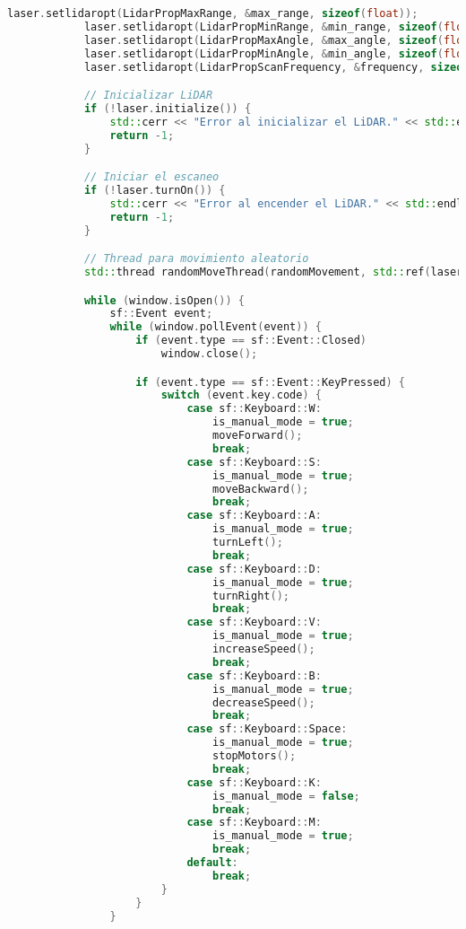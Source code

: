 \begin{lstlisting}[language={C++}, caption={Primera versi\'on del c\'odigo del sistema de control del robot}, label={Script}]
            laser.setlidaropt(LidarPropMaxRange, &max_range, sizeof(float));
            laser.setlidaropt(LidarPropMinRange, &min_range, sizeof(float));
            laser.setlidaropt(LidarPropMaxAngle, &max_angle, sizeof(float));
            laser.setlidaropt(LidarPropMinAngle, &min_angle, sizeof(float));
            laser.setlidaropt(LidarPropScanFrequency, &frequency, sizeof(float));

            // Inicializar LiDAR
            if (!laser.initialize()) {
                std::cerr << "Error al inicializar el LiDAR." << std::endl;
                return -1;
            }

            // Iniciar el escaneo
            if (!laser.turnOn()) {
                std::cerr << "Error al encender el LiDAR." << std::endl;
                return -1;
            }

            // Thread para movimiento aleatorio
            std::thread randomMoveThread(randomMovement, std::ref(laser));

            while (window.isOpen()) {
                sf::Event event;
                while (window.pollEvent(event)) {
                    if (event.type == sf::Event::Closed)
                        window.close();

                    if (event.type == sf::Event::KeyPressed) {
                        switch (event.key.code) {
                            case sf::Keyboard::W:
                                is_manual_mode = true;
                                moveForward();
                                break;
                            case sf::Keyboard::S:
                                is_manual_mode = true;
                                moveBackward();
                                break;
                            case sf::Keyboard::A:
                                is_manual_mode = true;
                                turnLeft();
                                break;
                            case sf::Keyboard::D:
                                is_manual_mode = true;
                                turnRight();
                                break;
                            case sf::Keyboard::V:
                                is_manual_mode = true;
                                increaseSpeed();
                                break;
                            case sf::Keyboard::B:
                                is_manual_mode = true;
                                decreaseSpeed();
                                break;
                            case sf::Keyboard::Space:
                                is_manual_mode = true;
                                stopMotors();
                                break;
                            case sf::Keyboard::K:
                                is_manual_mode = false;
                                break;
                            case sf::Keyboard::M:
                                is_manual_mode = true;
                                break;
                            default:
                                break;
                        }
                    }
                }


\end{lstlisting}
